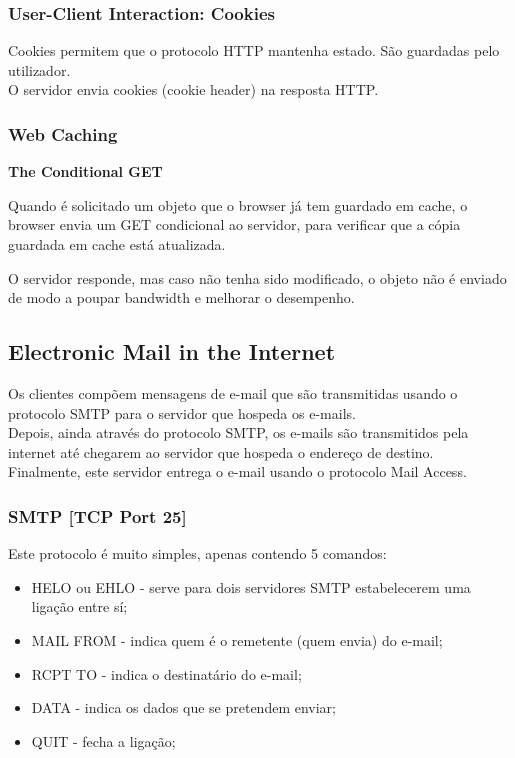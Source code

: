 \documentclass[12pt]{article}
\begin{document}
\subsubsection{User-Client Interaction: Cookies}

Cookies permitem que o protocolo HTTP mantenha estado. São guardadas pelo utilizador. \\
O servidor envia cookies (cookie header) na resposta HTTP.

\subsubsection{Web Caching}

\subsubitem \textbf{The Conditional GET}

Quando é solicitado um objeto que o browser já tem guardado em cache, o browser envia um GET condicional ao servidor, para verificar que a cópia guardada em cache está atualizada. \par
O servidor responde, mas caso não tenha sido modificado, o objeto não é enviado de modo a poupar bandwidth e melhorar o desempenho.

\subsection{Electronic Mail in the Internet}

Os clientes compõem mensagens de e-mail que são transmitidas usando o protocolo SMTP para o servidor que hospeda os e-mails. \\
Depois, ainda através do protocolo SMTP, os e-mails são transmitidos pela internet até chegarem ao servidor que hospeda o endereço de destino. \\
Finalmente, este servidor entrega o e-mail usando o protocolo Mail Access.

\subsubsection{SMTP [TCP Port 25]}

Este protocolo é muito simples, apenas contendo 5 comandos:

\begin{itemize}
    \item HELO ou EHLO - serve para dois servidores SMTP estabelecerem uma ligação entre sí;
    \item MAIL FROM - indica quem é o remetente (quem envia) do e-mail;
    \item RCPT TO - indica o destinatário do e-mail;
    \item DATA - indica os dados que se pretendem enviar;
    \item QUIT - fecha a ligação;
\end{itemize}
\end{document}
